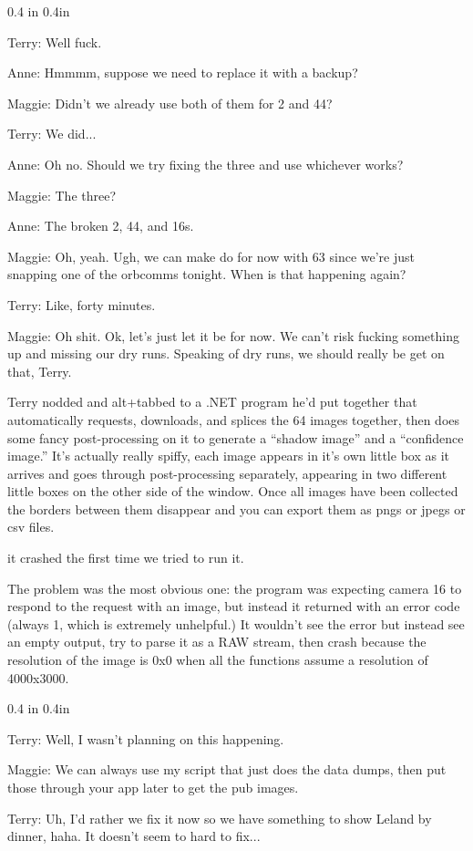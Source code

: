 \documentclass[a5paper,10pt]{book}
\newenvironment{dialogue}
{
\it
\renewcommand{\:}{\rm:}
\PushPreHook{par}{\it}

\begin{changemargin}{ 0.4 in}{ 0.4in}
\addtolength{\parskip}{0.1em}
}
{
\addtolength{\parskip}{-0.1em}
\end{changemargin}

\PopPreHook{par}
}
\begin{document}
\begin{dialogue}
  Terry\: Well fuck.

  Anne\: Hmmmm, suppose we need to replace it with a backup?

  Maggie\: Didn't we already use both of them for 2 and 44?

  Terry\: We did...

  Anne\: Oh no. Should we try fixing the three and use whichever works?

  Maggie\: The three?

  Anne\: The broken 2, 44, and 16s.

  Maggie\: Oh, yeah. Ugh, we can make do for now with 63 since we're just snapping one of the orbcomms tonight. When is that happening again?

  Terry\: Like, forty minutes.

  Maggie\: Oh shit. Ok, let's just let it be for now. We can't risk fucking something up and missing our dry runs. Speaking of dry runs, we should really be get on that, Terry. 
\end{dialogue}

Terry nodded and alt+tabbed to a .NET program he'd put together that automatically requests, downloads, and splices the 64 images together, then does some fancy post-processing on it to generate a ``shadow image'' and a ``confidence image.'' It's actually really spiffy, each image appears in it's own little box as it arrives and goes through post-processing separately, appearing in two different little boxes on the other side of the window. Once all images have been collected the borders between them disappear and you can export them as pngs or jpegs or csv files.

it crashed the first time we tried to run it.

The problem was the most obvious one: the program was expecting camera 16 to respond to the request with an image, but instead it returned with an error code (always 1, which is extremely unhelpful.) It wouldn't see the error but instead see an empty output, try to parse it as a RAW stream, then crash because the resolution of the image is 0x0 when all the functions assume a resolution of 4000x3000.

\begin{dialogue}
  Terry\: Well, I wasn't planning on this happening.

  Maggie\: We can always use my script that just does the data dumps, then put those through your app later to get the pub images.

  Terry\: Uh, I'd rather we fix it now so we have something to show Leland by dinner, haha. It doesn't seem to hard to fix...
\end{dialogue}
\end{document}
